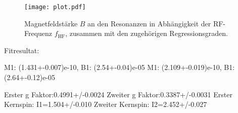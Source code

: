 \begin{figure} [H]
  \centering
  \texttt{[image: plot.pdf]}
  \caption{Magnetfeldstärke $B$ an den Resonanzen in Abhängigkeit der RF-Frequenz $f_{\text{HF}}$, zusammen mit den zugehörigen Regressionsgraden.}
  \label{fig:plot}
\end{figure}

Fitresultat:

M1: (1.431+-0.007)e-10, B1: (2.54+-0.04)e-05
M1: (2.109+-0.019)e-10, B1: (2.64+-0.12)e-05

Erster g Faktor:0.4991+/-0.0024
Zweiter g Faktor:0.3387+/-0.0031
Erster Kernspin: I1=1.504+/-0.010
Zweiter Kernspin: I2=2.452+/-0.027
